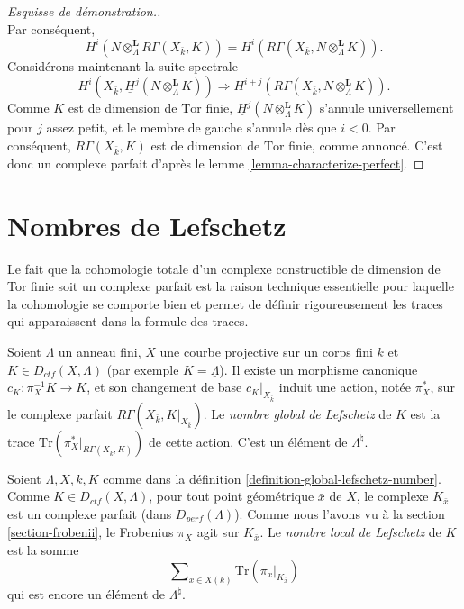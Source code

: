 \begin{proof}[Esquisse de démonstration.]
$$$$
Par conséquent,
$$
H^i (N \otimes^\mathbf{L}_\Lambda R\Gamma(X_{\bar k}, K)) = H^i(R\Gamma(X_{\bar
k}, N \otimes_{\Lambda}^\mathbf{L} K)).
$$
Considérons maintenant la suite spectrale
$$
H^i (X_{\bar k}, \underline H^j (N \otimes_{\Lambda}^\mathbf{L} K))
\Rightarrow
H^{i+j}(R\Gamma(X_{\bar k}, N \otimes_{\Lambda}^\mathbf{L} K)).
$$
Comme $K$ est de dimension de $\text{Tor}$ finie, $\underline H^j
(N \otimes_{\Lambda}^\mathbf{L} K)$ s'annule universellement pour $j$ assez petit,
et le membre de gauche s'annule dès que $i < 0$. Par conséquent, $R\Gamma(X_{\bar
k}, K)$ est de dimension de $\text{Tor}$ finie, comme annoncé. C'est donc un
complexe parfait d'après le lemme \ref{lemma-characterize-perfect}.
\end{proof}





\section{Nombres de Lefschetz}
\label{section-lefschetz-numbers}

\noindent
Le fait que la cohomologie totale d'un complexe constructible de dimension de Tor
finie soit un complexe parfait est la raison technique essentielle pour laquelle la cohomologie
se comporte bien et permet de définir rigoureusement les traces qui apparaissent dans la
formule des traces.

\begin{definition}
\label{definition-global-lefschetz-number}
Soient $\Lambda$ un anneau fini, $X$ une courbe projective sur un corps fini $k$
et $K \in D_{ctf}(X, \Lambda)$ (par exemple $K = \underline\Lambda$).
Il existe un morphisme canonique $c_K : \pi_X^{-1}K \to K$, et son changement de base
$c_K|_{X_{\bar k}}$ induit une action, notée $\pi_X^*$, sur le complexe parfait
$R\Gamma(X_{\bar k}, K|_{X_{\bar k}})$. Le
{\it nombre global de Lefschetz} de $K$ est la trace
$\text{Tr}(\pi_X^* |_{R\Gamma(X_{\bar k}, K)})$ de cette action.
C'est un élément de $\Lambda^\natural$.
\end{definition}

\begin{definition}
\label{definition-local-lefschetz-number}
Soient $\Lambda, X, k, K$ comme dans la
définition \ref{definition-global-lefschetz-number}.
Comme $K\in D_{ctf}(X, \Lambda)$, pour tout point géométrique $\bar x$ de $X$,
le complexe $K_{\bar x}$ est un complexe parfait (dans $D_{perf}(\Lambda)$). Comme nous
l'avons vu à la section \ref{section-frobenii}, le Frobenius $\pi_X$ agit sur
$K_{\bar x}$. Le {\it nombre local de Lefschetz} de $K$ est la somme
$$
\sum\nolimits_{x\in X(k)} \text{Tr}(\pi_x |_{K_{\overline{x}}})
$$
qui est encore un élément de $\Lambda^\natural$.
\end{definition}

